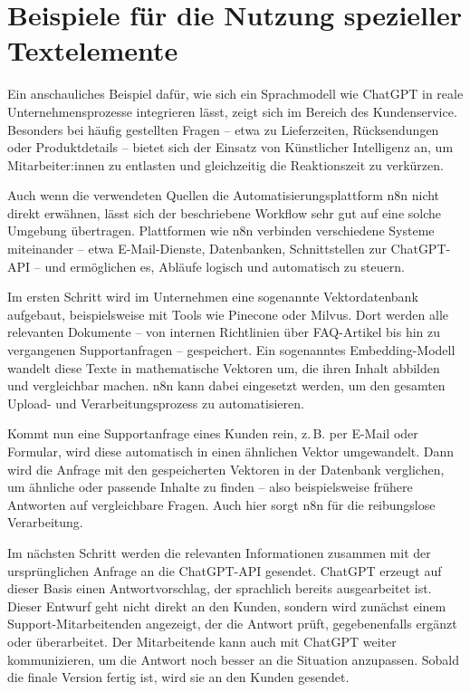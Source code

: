 \documentclass[utf8,biblatex]{bremerhaven_lni}
\begin{document}
\section{Beispiele für die Nutzung spezieller Textelemente}

Ein anschauliches Beispiel dafür, wie sich ein Sprachmodell wie ChatGPT in reale Unternehmensprozesse integrieren lässt, zeigt sich im Bereich des Kundenservice. Besonders bei häufig gestellten Fragen – etwa zu Lieferzeiten, Rücksendungen oder Produktdetails – bietet sich der Einsatz von Künstlicher Intelligenz an, um Mitarbeiter:innen zu entlasten und gleichzeitig die Reaktionszeit zu verkürzen.

Auch wenn die verwendeten Quellen die Automatisierungsplattform n8n nicht direkt erwähnen, lässt sich der beschriebene Workflow sehr gut auf eine solche Umgebung übertragen. Plattformen wie n8n verbinden verschiedene Systeme miteinander – etwa E-Mail-Dienste, Datenbanken, Schnittstellen zur ChatGPT-API – und ermöglichen es, Abläufe logisch und automatisch zu steuern.

Im ersten Schritt wird im Unternehmen eine sogenannte Vektordatenbank aufgebaut, beispielsweise mit Tools wie Pinecone oder Milvus. Dort werden alle relevanten Dokumente – von internen Richtlinien über FAQ-Artikel bis hin zu vergangenen Supportanfragen – gespeichert. Ein sogenanntes Embedding-Modell wandelt diese Texte in mathematische Vektoren um, die ihren Inhalt abbilden und vergleichbar machen. n8n kann dabei eingesetzt werden, um den gesamten Upload- und Verarbeitungsprozess zu automatisieren.

Kommt nun eine Supportanfrage eines Kunden rein, z. B. per E-Mail oder Formular, wird diese automatisch in einen ähnlichen Vektor umgewandelt. Dann wird die Anfrage mit den gespeicherten Vektoren in der Datenbank verglichen, um ähnliche oder passende Inhalte zu finden – also beispielsweise frühere Antworten auf vergleichbare Fragen. Auch hier sorgt n8n für die reibungslose Verarbeitung.

Im nächsten Schritt werden die relevanten Informationen zusammen mit der ursprünglichen Anfrage an die ChatGPT-API gesendet. ChatGPT erzeugt auf dieser Basis einen Antwortvorschlag, der sprachlich bereits ausgearbeitet ist. Dieser Entwurf geht nicht direkt an den Kunden, sondern wird zunächst einem Support-Mitarbeitenden angezeigt, der die Antwort prüft, gegebenenfalls ergänzt oder überarbeitet. Der Mitarbeitende kann auch mit ChatGPT weiter kommunizieren, um die Antwort noch besser an die Situation anzupassen. Sobald die finale Version fertig ist, wird sie an den Kunden gesendet.
\end{document}
